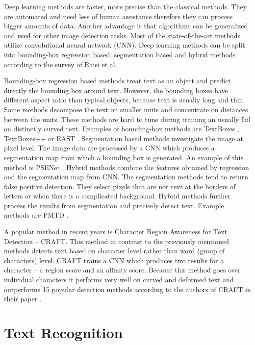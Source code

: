 Deep learning methods are faster, more precise than the classical methods. They are automated and need less of human assistance therefore they can process bigger amounts of data. Another advantage is that algorithms can be generalized and used for other image detection tasks. Most of the state-of-the-art methods utilize convolutional neural network (CNN). Deep learning methods can be split into bounding-box regression based, segmentation based and hybrid methods according to the survey of Raisi et al.\cite{raisi2020text}.

Bounding-box regression based methods treat text as an object and predict directly the bounding box around text. However, the bounding boxes have different aspect ratio than typical objects, because text is usually long and thin. Some methods decompose the text on smaller units and concentrate on distances between the units. These methods are hard to tune during training an usually fail on distinctly curved text. Examples of bounding-box methods are TextBoxes \cite{liao2017textboxes}, TextBoxes++ \cite{liao2018textboxes++} or EAST \cite{zhou2017east}. Segmentation based methods investigate the image at pixel level. The image data are processed by a CNN which produces a segmentation map from which a bounding box is generated. An example of this method is PSENet \cite{wang2019shape}. Hybrid methods combine the features obtained by regression and the segmentation map from CNN. The segmentation methods tend to return false positive detection. They select pixels that are not text at the borders of letters or when there is a complicated background. Hybrid methods further process the results from segmentation and precisely detect text. Example methods are PMTD \cite{liu2019pyramid}.

A popular method in recent years is Character Region Awareness for Text Detection -- CRAFT. This method in contrast to the previously mentioned methods detects text based on character level rather than word (group of characters) level. CRAFT trains a CNN which produces two results for a character -- a region score and an affinity score. Because this method goes over individual characters it performs very well on curved and deformed text and outperforms 15 popular detection methods according to the authors of CRAFT in their paper \cite{craft2}.


\section{Text Recognition}

